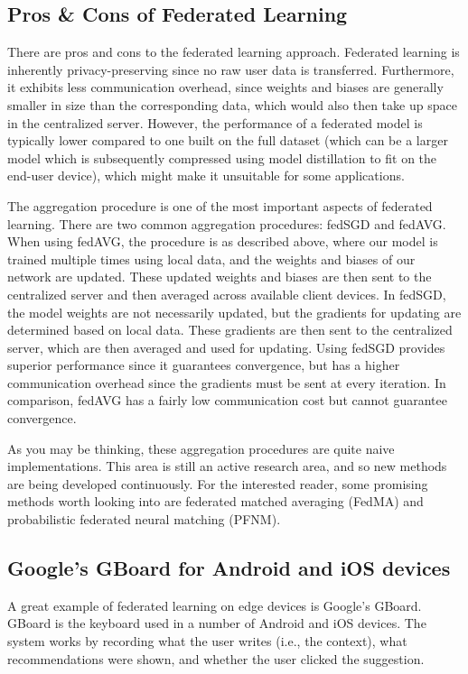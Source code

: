 {{{{{{{{    \subsection{Pros \& Cons of Federated Learning}
    
    There are pros and cons to the federated learning approach. Federated learning is inherently privacy-preserving since no raw user data is transferred. Furthermore, it exhibits less communication overhead, since weights and biases are generally smaller in size than the corresponding data, which would also then take up space in the centralized server. However,  the performance of a federated model is typically lower compared to one built on the full dataset (which can be a larger model which is subsequently compressed using model distillation to fit on the end-user device), which might make it unsuitable for some applications.
    
    The aggregation procedure is one of the most important aspects of federated learning. There are two common aggregation procedures: fedSGD and fedAVG. When using fedAVG, the procedure is as described above, where our model is trained multiple times using local data, and the weights and biases of our network are updated. These updated weights and biases are then sent to the centralized server and then averaged across available client devices. In fedSGD, the model weights are not necessarily updated, but the gradients for updating are determined based on local data. These gradients are then sent to the centralized server, which are then averaged and used for updating. Using fedSGD provides superior performance since it guarantees convergence, but has a higher communication overhead since the gradients must be sent at every iteration. In comparison, fedAVG has a fairly low communication cost but cannot guarantee convergence.
    
    As you may be thinking, these aggregation procedures are quite naive implementations. This area is still an active research area, and so new methods are being developed continuously. For the interested reader, some promising methods worth looking into are federated matched averaging (FedMA) and probabilistic federated neural matching (PFNM).
    
    \subsection{Google’s GBoard for Android and iOS devices}
    
    A great example of federated learning on edge devices is Google’s GBoard. GBoard is the keyboard used in a number of Android and iOS devices. The system works by recording what the user writes (i.e., the context), what recommendations were shown, and whether the user clicked the suggestion.
    
}}}}}}}}
